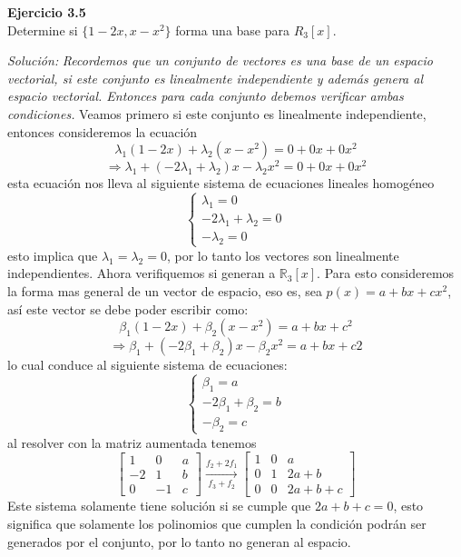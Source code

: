 \documentclass{article}
\newenvironment{problem}[2][Ejercicio]
    { \begin{mdframed}[backgroundcolor=gray!20] \textbf{#1 #2} \\}
    {  \end{mdframed}}
\newenvironment{solution}
    {\textit{Solución:}}
    {}
\begin{document}
\begin{problem}{3.5}
    Determine si $\{ 1 - 2x, x - x^2\}$ forma una base para $R_3[x]$.
\end{problem}
\begin{solution}
    \emph{Recordemos que un conjunto de vectores es una base de un espacio vectorial, si este conjunto es linealmente independiente y además genera al espacio vectorial. Entonces para cada conjunto debemos verificar ambas condiciones.}
Veamos primero si este conjunto es linealmente independiente, entonces consideremos la ecuación
\[
\lambda_1 (1 - 2x) + \lambda_2 (x - x^2) = 0 + 0x + 0x^2
\]\[
\Rightarrow \lambda_1 + (-2\lambda_1 + \lambda_2) x - \lambda_2x^2 = 0 + 0x + 0x^2
\]
esta ecuación nos lleva al siguiente sistema de ecuaciones lineales homogéneo
\[
\begin{cases}
\lambda_1 = 0 \\
-2\lambda_1 + \lambda_2 = 0 \\
-\lambda_2 = 0
\end{cases}
\]
esto implica que $\lambda_1 = \lambda_2 = 0$, por lo tanto los vectores son linealmente independientes. Ahora verifiquemos si generan a $\mathbb{R}_3[x]$. Para esto consideremos la forma mas general de un vector de espacio, eso es, sea $p(x) = a + bx + cx^2$, así este vector se debe poder escribir como:
\[
\beta_1 (1 - 2x) + \beta_2 (x - x^2) = a + bx + c^2
\]\[
\Rightarrow \beta_1 + (-2\beta_1 + \beta_2) x - \beta_2x^2 = a + bx + c2
\]
lo cual conduce al siguiente sistema de ecuaciones:
\[
\begin{cases}
\beta_1 = a \\
-2\beta_1 + \beta_2 = b \\
-\beta_2 = c
\end{cases}
\]
al resolver con la matriz aumentada tenemos
\[
\begin{bmatrix}
1 & 0 & a \\
-2 & 1 & b \\
0 & -1 & c
\end{bmatrix} \xrightarrow[f_3+f_2]{f_2+2f_1}
\begin{bmatrix}
1 & 0 & a \\
0 & 1 & 2a+b \\
0 & 0 & 2a+b+c
\end{bmatrix}
\]
Este sistema solamente tiene solución si se cumple que $2a + b + c = 0$, esto significa que solamente los polinomios que cumplen la condición podrán ser generados por el conjunto, por lo tanto no generan al espacio.
\end{solution}
\end{document}
